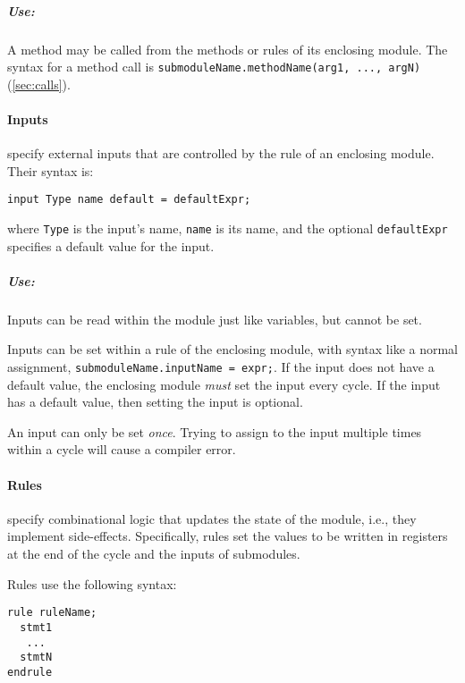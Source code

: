 
\subparagraph{Use:}
A method may be called from the methods or rules of its enclosing module.
The syntax for a method call is
\verb|submoduleName.methodName(arg1, ..., argN)|
(\autoref{sec:calls}).


\paragraph{Inputs} specify external inputs that are controlled by
the rule of an enclosing module. Their syntax is:
\begin{center}
\verb|input Type name |\optStart\verb|default = defaultExpr|\optEnd\verb|;|
\end{center}
where \verb|Type| is the input's name,
\verb|name| is its name,
and the optional \verb|defaultExpr| specifies a default value for the input.

\subparagraph{Use:}
Inputs can be read within the module just like variables, but cannot be set.

Inputs can be set within a rule of the enclosing module,
with syntax like a normal assignment, \verb|submoduleName.inputName = expr;|.
If the input does not have a default value,
the enclosing module \emph{must} set the input every cycle.
If the input has a default value, then setting the input is optional.

An input can only be set \emph{once}. Trying to assign to the input multiple
times within a cycle will cause a compiler error.


\paragraph{Rules} specify combinational logic that updates the state of the module,
i.e., they implement side-effects.
Specifically, rules set the values to be written in registers
at the end of the cycle and the inputs of submodules.

Rules use the following syntax:
\begin{center}
  \verb|rule ruleName;| \\
  \verb|  stmt1       | \\
  \verb|   ...        | \\
  \verb|  stmtN       | \\
  \verb|endrule       |
\end{center}

